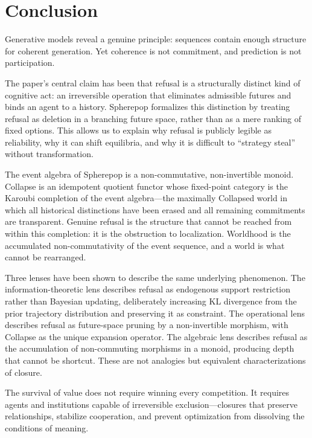\documentclass[11pt]{article}
\begin{document}
\section{Conclusion}

Generative models reveal a genuine principle: sequences contain enough structure
for coherent generation. Yet coherence is not commitment, and prediction is not
participation.

The paper's central claim has been that refusal is a structurally distinct kind
of cognitive act: an irreversible operation that eliminates admissible futures
and binds an agent to a history. Spherepop formalizes this distinction by
treating refusal as deletion in a branching future space, rather than as a mere
ranking of fixed options. This allows us to explain why refusal is publicly
legible as reliability, why it can shift equilibria, and why it is difficult to
``strategy steal'' without transformation.

The event algebra of Spherepop is a non-commutative, non-invertible monoid.
Collapse is an idempotent quotient functor whose fixed-point category is the
Karoubi completion of the event algebra---the maximally Collapsed world in which
all historical distinctions have been erased and all remaining commitments are
transparent. Genuine refusal is the structure that cannot be reached from within
this completion: it is the obstruction to localization. Worldhood is the
accumulated non-commutativity of the event sequence, and a world is what cannot
be rearranged.

Three lenses have been shown to describe the same underlying phenomenon. The
information-theoretic lens describes refusal as endogenous support restriction
rather than Bayesian updating, deliberately increasing KL divergence from the
prior trajectory distribution and preserving it as constraint. The operational
lens describes refusal as future-space pruning by a non-invertible morphism,
with Collapse as the unique expansion operator. The algebraic lens describes
refusal as the accumulation of non-commuting morphisms in a monoid, producing
depth that cannot be shortcut. These are not analogies but equivalent
characterizations of closure.

The survival of value does not require winning every competition. It requires
agents and institutions capable of irreversible exclusion---closures that
preserve relationships, stabilize cooperation, and prevent optimization from
dissolving the conditions of meaning.
\end{document}
